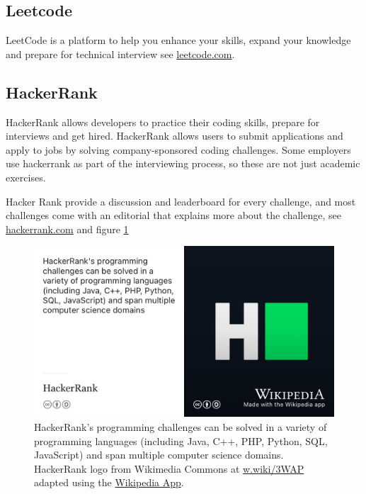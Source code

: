\documentclass[
]{book}
\begin{document}
\hypertarget{leetcode}{%
\subsection{Leetcode}\label{leetcode}}

LeetCode is a platform to help you enhance your skills, expand your knowledge and prepare for technical interview see \href{https://leetcode.com}{leetcode.com}.

\hypertarget{hackerrank}{%
\subsection{HackerRank}\label{hackerrank}}

HackerRank allows developers to practice their coding skills, prepare for interviews and get hired. HackerRank allows users to submit applications and apply to jobs by solving company-sponsored coding challenges. Some employers use hackerrank as part of the interviewing process, so these are not just academic exercises.

Hacker Rank provide a discussion and leaderboard for every challenge, and most challenges come with an editorial that explains more about the challenge, see \href{https://www.hackerrank.com/}{hackerrank.com} and figure \ref{fig:hackerrank-fig}

\begin{figure}

{\centering \includegraphics[width=0.99\linewidth]{images/hackerrank} 

}

\caption{HackerRank's programming challenges can be solved in a variety of programming languages (including Java, C++, PHP, Python, SQL, JavaScript) and span multiple computer science domains. HackerRank logo from Wikimedia Commons at \href{https://w.wiki/3WAP}{w.wiki/3WAP} adapted using the \href{https://apps.apple.com/us/app/wikipedia/id324715238}{Wikipedia App}.}\label{fig:hackerrank-fig}
\end{figure}
\end{document}
